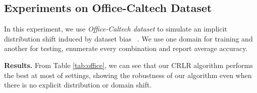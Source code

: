 \documentclass[sigconf]{acmart}
\begin{document}
\subsection{Experiments on Office-Caltech Dataset}
In this experiment, we use \emph{Office-Caltech dataset} to simulate an implicit distribution shift induced by dataset bias ~\cite{torralba2011unbiased}.
We use one domain for training and another for testing, enumerate every combination and report average accuracy.

\begin{table*}[!htbp]
    \centering
    \caption{Average accuracy on dataset bias. $a, d, w, c$ denote the four different domains Amazon, DSLR, Webcam and Caltech, respectively.}
    \label{tab:office}
\end{table*}\textbf{Results.} From Table \ref{tab:office}, we can see that our CRLR algorithm performs the best at most of settings, showing the robustness of our algorithm even when there is no explicit distribution or domain shift.
\end{document}
